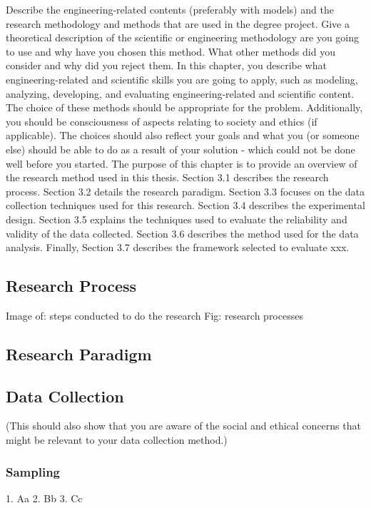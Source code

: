 \documentclass[a4paper,10pt,twocolumn]{article}
\numberwithin{figure}{section}
\numberwithin{table}{section}
\begin{document}
Describe the engineering-related contents (preferably with models) and the research methodology
and methods that are used in the degree project.
Give a theoretical description of the scientific or engineering methodology are you going to use
and why have you chosen this method. What other methods did you consider and why did you reject
them.
In this chapter, you describe what engineering-related and scientific skills you are going to
apply, such as modeling, analyzing, developing, and evaluating engineering-related and scientific
content. The choice of these methods should be appropriate for the problem. Additionally, you
should be consciousness of aspects relating to society and ethics (if applicable). The choices should
also reflect your goals and what you (or someone else) should be able to do as a result of your
solution - which could not be done well before you started.
The purpose of this chapter is to provide an overview of the research method used in this thesis.
Section 3.1 describes the research process. Section 3.2 details the research paradigm. Section 3.3
focuses on the data collection techniques used for this research. Section 3.4 describes the
experimental design. Section 3.5 explains the techniques used to evaluate the reliability and validity
of the data collected. Section 3.6 describes the method used for the data analysis. Finally, Section 3.7
describes the framework selected to evaluate xxx.

\subsection{Research Process}
Image of: steps conducted to do the research 
Fig: research processes


\subsection{Research Paradigm}

\subsection{Data Collection}
(This should also show that you are aware of the social and ethical concerns that might be relevant
to your data collection method.)

\subsubsection{Sampling}
1. Aa
2. Bb
3. Cc
\end{document}
